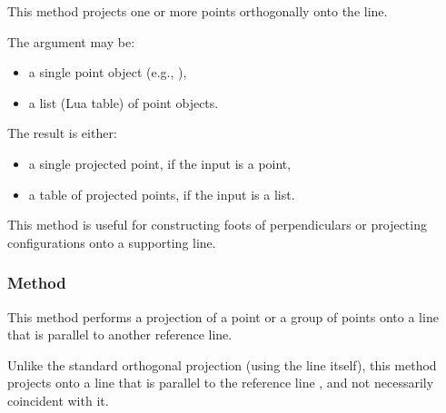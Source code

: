 This method projects one or more points orthogonally onto the line.

\medskip

The argument  may be:
\begin{itemize}
  \item a single point object (e.g., ),
  \item a list (Lua table) of point objects.
\end{itemize}


The result is either:
\begin{itemize}
  \item a single projected point, if the input is a point,
  \item a table of projected points, if the input is a list.
\end{itemize}

\medskip

This method is useful for constructing foots of perpendiculars or projecting configurations onto a supporting line.

\vspace{1em}

\begin{tkzexample}[latex=.5\textwidth]
\begin{center}
\end{center}
\end{tkzexample}

\subsubsection{Method }
\label{ssub:method_line_projection__ll}

This method performs a projection of a point or a group of points onto a line that is parallel to another reference line.

\medskip

Unlike the standard orthogonal projection (using the line itself), this method projects onto a line that is parallel to the reference line , and not necessarily coincident with it.

